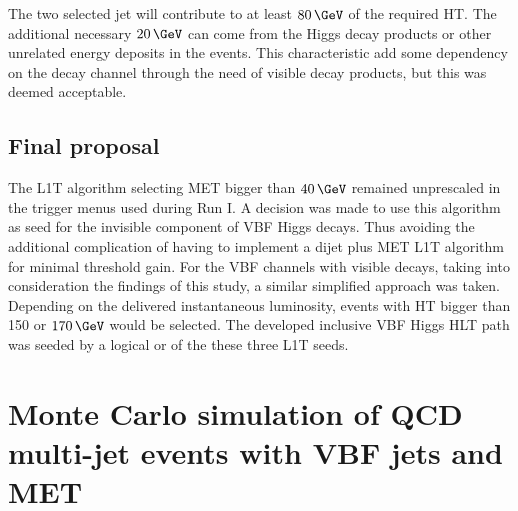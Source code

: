 The two selected jet will contribute to at least $80\,\GeV$ of the required \gls{HT}. The additional necessary $20\,\GeV$ can come from the Higgs decay products or other unrelated energy deposits in the events. This characteristic add some dependency on the decay channel through the need of visible decay products, but this was deemed acceptable.

\subsection{Final proposal}


The \gls{L1T} algorithm selecting \gls{MET} bigger than $40\,\GeV$ remained unprescaled in the trigger menus used during Run I. A decision was made to use this algorithm as seed for the invisible component of \gls{VBF} Higgs decays. Thus avoiding the additional complication of having to implement a dijet plus \gls{MET} \gls{L1T} algorithm for minimal threshold gain. For the \gls{VBF} channels with visible decays, taking into consideration the findings of this study, a similar simplified approach was taken. Depending on the delivered instantaneous luminosity, events with \gls{HT} bigger than 150 or $170\,\GeV$ would be selected. The developed inclusive \gls{VBF} Higgs \gls{HLT} path was seeded by a logical or of the these three \gls{L1T} seeds.

\section{Monte Carlo simulation of QCD multi-jet events with VBF jets and MET}
\label{SECTION:PreparationParkedDataAnalysis_QCDVBFMET}

% 
% 

